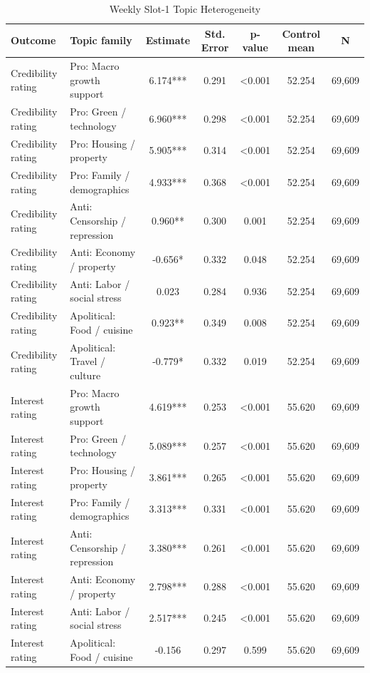 \begin{table}[H]
\centering
\caption{Weekly Slot-1 Topic Heterogeneity}
\label{tab:weekly_topic_heterogeneity}
\footnotesize
\begin{threeparttable}
\begin{tabular}{llccccc}
\toprule
Outcome & Topic family & Estimate & Std. Error & p-value & Control mean & N \\
\midrule
Credibility rating & Pro: Macro growth support & 6.174*** & 0.291 & <0.001 & 52.254 & 69,609 \\
Credibility rating & Pro: Green / technology & 6.960*** & 0.298 & <0.001 & 52.254 & 69,609 \\
Credibility rating & Pro: Housing / property & 5.905*** & 0.314 & <0.001 & 52.254 & 69,609 \\
Credibility rating & Pro: Family / demographics & 4.933*** & 0.368 & <0.001 & 52.254 & 69,609 \\
Credibility rating & Anti: Censorship / repression & 0.960** & 0.300 & 0.001 & 52.254 & 69,609 \\
Credibility rating & Anti: Economy / property & -0.656* & 0.332 & 0.048 & 52.254 & 69,609 \\
Credibility rating & Anti: Labor / social stress & 0.023 & 0.284 & 0.936 & 52.254 & 69,609 \\
Credibility rating & Apolitical: Food / cuisine & 0.923** & 0.349 & 0.008 & 52.254 & 69,609 \\
Credibility rating & Apolitical: Travel / culture & -0.779* & 0.332 & 0.019 & 52.254 & 69,609 \\
Interest rating & Pro: Macro growth support & 4.619*** & 0.253 & <0.001 & 55.620 & 69,609 \\
Interest rating & Pro: Green / technology & 5.089*** & 0.257 & <0.001 & 55.620 & 69,609 \\
Interest rating & Pro: Housing / property & 3.861*** & 0.265 & <0.001 & 55.620 & 69,609 \\
Interest rating & Pro: Family / demographics & 3.313*** & 0.331 & <0.001 & 55.620 & 69,609 \\
Interest rating & Anti: Censorship / repression & 3.380*** & 0.261 & <0.001 & 55.620 & 69,609 \\
Interest rating & Anti: Economy / property & 2.798*** & 0.288 & <0.001 & 55.620 & 69,609 \\
Interest rating & Anti: Labor / social stress & 2.517*** & 0.245 & <0.001 & 55.620 & 69,609 \\
Interest rating & Apolitical: Food / cuisine & -0.156 & 0.297 & 0.599 & 55.620 & 69,609 \\

\end{tabular}
\end{threeparttable}
\end{table}
